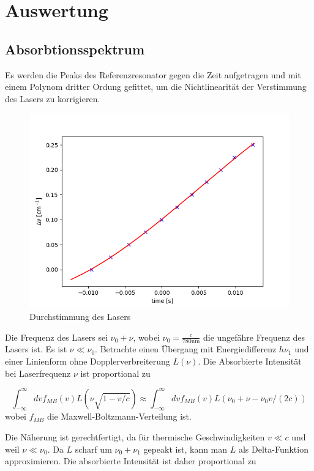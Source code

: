 \documentclass[a4paper,parskip]{scrartcl}
\begin{document}
\section{Auswertung}

\subsection{Absorbtionsspektrum}

Es werden die Peaks des Referenzresonator gegen die Zeit aufgetragen und mit einem Polynom dritter Ordung gefittet, um die Nichtlinearität der Verstimmung des Lasers zu korrigieren.

\begin{figure}[h]
\centering
\includegraphics[scale = 0.5]{./absorbtion/frequencyCorrection}
\caption{Durchstimmung des Lasers}
\end{figure}

Die Frequenz des Lasers sei $\nu_0+\nu$, wobei $\nu_0=\frac{c}{780\mathrm{nm}}$ die ungefähre Frequenz des Lasers ist. Es ist $\nu \ll \nu_0$.
Betrachte einen Übergang mit Energiedifferenz $h\nu_1$ und einer Linienform ohne Dopplerverbreiterung $L(\nu)$.  Die Absorbierte Intensität bei Laserfrequenz $\nu$ ist proportional zu

$$\int_{-\infty}^{\infty} dv f_{MB}(v)L(\nu\sqrt{1-v/c}) \approx \int_{-\infty}^{\infty} dv f_{MB}(v)L(\nu_0+\nu-\nu_0 v/(2c))$$
wobei $f_{MB}$ die Maxwell-Boltzmann-Verteilung ist.

Die Näherung ist gerechtfertigt, da für thermische Geschwindigkeiten $v \ll c$ und weil $\nu \ll \nu_0$. Da $L$ scharf um $\nu_0 + \nu_1$ gepeakt ist, kann man $L$ als Delta-Funktion approximieren. Die absorbierte Intensität ist daher proportional zu
\end{document}
